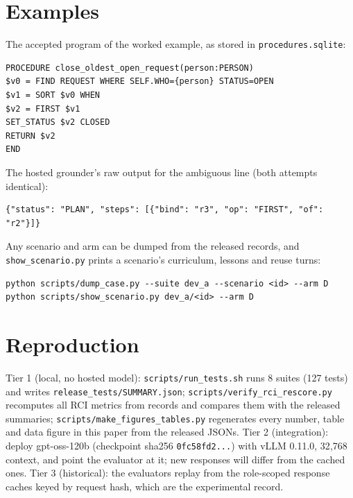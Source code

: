 \documentclass[10pt]{article}
\newcommand{\id}[1]{\nolinkurl{#1}}
\begin{document}
\section{Examples}\label{app:examples}
The accepted program of the worked example, as stored in \id{procedures.sqlite}:
\begin{Verbatim}
PROCEDURE close_oldest_open_request(person:PERSON)
$v0 = FIND REQUEST WHERE SELF.WHO={person} STATUS=OPEN
$v1 = SORT $v0 WHEN
$v2 = FIRST $v1
SET_STATUS $v2 CLOSED
RETURN $v2
END
\end{Verbatim}
The hosted grounder's raw output for the ambiguous line (both attempts identical):
\begin{Verbatim}
{"status": "PLAN", "steps": [{"bind": "r3", "op": "FIRST", "of": "r2"}]}
\end{Verbatim}
Any scenario and arm can be dumped from the released records, and \id{show_scenario.py} prints a scenario's curriculum, lessons and reuse turns:
\begin{Verbatim}
python scripts/dump_case.py --suite dev_a --scenario <id> --arm D
python scripts/show_scenario.py dev_a/<id> --arm D
\end{Verbatim}

\section{Reproduction}\label{app:repro}
Tier 1 (local, no hosted model): \id{scripts/run_tests.sh} runs 8 suites (127 tests) and writes \id{release_tests/SUMMARY.json}; \id{scripts/verify_rci_rescore.py} recomputes all RCI metrics from records and compares them with the released summaries; \id{scripts/make_figures_tables.py} regenerates every number, table and data figure in this paper from the released JSONs. Tier 2 (integration): deploy gpt-oss-120b (checkpoint sha256 \id{0fc58fd2...}) with vLLM 0.11.0, 32{,}768 context, and point the evaluator at it; new responses will differ from the cached ones. Tier 3 (historical): the evaluators replay from the role-scoped response caches keyed by request hash, which are the experimental record.
\end{document}
